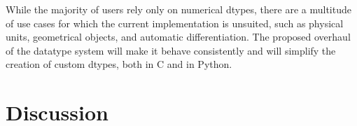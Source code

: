 While the majority of users rely only on numerical dtypes,
there are a multitude of use cases for which the current implementation is unsuited, such as physical units\cite{astropy,Goldbaum2018,pint},
geometrical objects\cite{pygeos}, and automatic
differentiation\cite{pyadolc}.
The proposed overhaul of the datatype system will make it behave consistently and will simplify the creation of custom dtypes, both in C and in Python.

\section*{Discussion}
